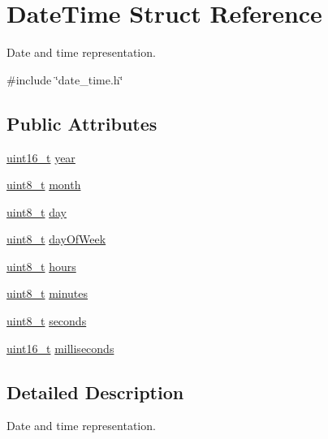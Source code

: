 \hypertarget{structDateTime}{}\section{Date\+Time Struct Reference}
\label{structDateTime}


Date and time representation.  




{\ttfamily \#include \char`\"{}date\+\_\+time.\+h\char`\"{}}

\subsection*{Public Attributes}
\begin{DoxyCompactItemize}
\item 
\hyperlink{stdint_8h_a273cf69d639a59973b6019625df33e30}{uint16\+\_\+t} \hyperlink{structDateTime_a0a61d60280541502e47f9a7fd6e1c8d2}{year}
\item 
\hyperlink{stdint_8h_aba7bc1797add20fe3efdf37ced1182c5}{uint8\+\_\+t} \hyperlink{structDateTime_ac895afb51c74941c50205f746b709148}{month}
\item 
\hyperlink{stdint_8h_aba7bc1797add20fe3efdf37ced1182c5}{uint8\+\_\+t} \hyperlink{structDateTime_a727866b5ecdfda1edf946efe86aa74af}{day}
\item 
\hyperlink{stdint_8h_aba7bc1797add20fe3efdf37ced1182c5}{uint8\+\_\+t} \hyperlink{structDateTime_a4bcfa5ccbae6858247fce0ddc0fbc47c}{day\+Of\+Week}
\item 
\hyperlink{stdint_8h_aba7bc1797add20fe3efdf37ced1182c5}{uint8\+\_\+t} \hyperlink{structDateTime_a46fa4e0c13c7fc19c8ae97a5642c4a15}{hours}
\item 
\hyperlink{stdint_8h_aba7bc1797add20fe3efdf37ced1182c5}{uint8\+\_\+t} \hyperlink{structDateTime_a9e705a28fc51e333616553313107d579}{minutes}
\item 
\hyperlink{stdint_8h_aba7bc1797add20fe3efdf37ced1182c5}{uint8\+\_\+t} \hyperlink{structDateTime_a428828f757146b36432b4669e8b27eeb}{seconds}
\item 
\hyperlink{stdint_8h_a273cf69d639a59973b6019625df33e30}{uint16\+\_\+t} \hyperlink{structDateTime_a8b3982e7347da9a62c2bfc6c273da909}{milliseconds}
\end{DoxyCompactItemize}


\subsection{Detailed Description}
Date and time representation. 

